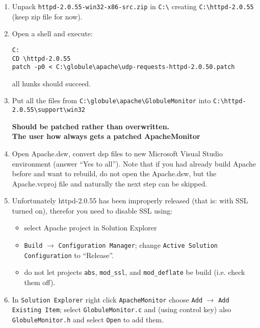 \documentclass[10pt,twoside]{article}
\begin{document}
\begin{enumerate}
\item Unpack \verb!httpd-2.0.55-win32-x86-src.zip! in \verb!C:\! creating
  \verb!C:\httpd-2.0.55! (keep zip file for now).

\item Open a shell and execute:
\begin{verbatim}
C:
CD \httpd-2.0.55
patch -p0 < C:\globule\apache\udp-requests-httpd-2.0.50.patch
\end{verbatim}
all hunks should succeed.

\item\label{step:buildwin} Put all the files from
  \verb!C:\globule\apache\GlobuleMonitor! into
  \verb!C:\httpd-2.0.55\support\win32!

  \textbf{Should be patched rather than overwritten.} \\
  \textbf{The user how always gets a patched ApacheMonitor}

\item Open Apache.dsw, convert dsp files to new Microsoft Visual Studio
  environment (answer ``Yes to all'').  Note that if you had already
  build Apache before and want to rebuild, do not open the Apache.dsw, but
  the Apache.vcproj file and naturally the next step can be skipped.
\item Unfortunately httpd-2.0.55 has been improperly released (that is: with
  SSL turned on), therefor you need to disable SSL using:
  
  \begin{itemize}
  \item select Apache project in Solution Explorer
  \item \texttt{Build} $\rightarrow$ \texttt{Configuration Manager};
    change \texttt{Active Solution Configuration} to ``Release''.
  \item do not let projects \texttt{abs}, \texttt{mod\_ssl}, and
    \texttt{mod\_deflate} be build (i.e. check them off).
  \end{itemize}
\item In \texttt{Solution Explorer} right click \texttt{ApacheMonitor} choose
  \texttt{Add} $\rightarrow$ \texttt{Add Existing Item};
  select \verb!GlobuleMonitor.c! and (using control key) also
  \verb!GlobuleMonitor.h! and select \texttt{Open} to add them.


\end{enumerate}
\end{document}
